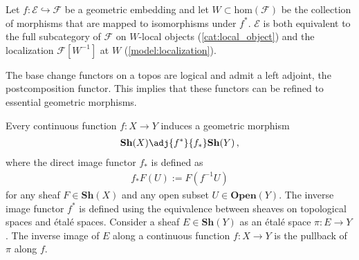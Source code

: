     \begin{property}\label{topos:characterization_embedding}
        Let $f:\mathcal{E}\hookrightarrow\mathcal{F}$ be a geometric embedding and let $W\subset\mathrm{hom}(\mathcal{F})$ be the collection of morphisms that are mapped to isomorphisms under $f^*$. $\mathcal{E}$ is both equivalent to the full subcategory of $\mathcal{F}$ on $W$-local objects (\cref{cat:local_object}) and the localization $\mathcal{F}[W^{-1}]$ at $W$ (\cref{model:localization}).
    \end{property}

    \begin{property}
        The base change functors on a topos are logical and admit a left adjoint, the postcomposition functor. This implies that these functors can be refined to essential geometric morphisms.
    \end{property}

    \begin{example}\label{topos:topological_spaces}
        Every continuous function $f:X\rightarrow Y$ induces a geometric morphism
        \begin{gather}
            \mathbf{Sh}(X)\adj{f^*}{f_*}\mathbf{Sh}(Y)\,,
        \end{gather}
        where the direct image functor $f_*$ is defined as
        \begin{gather}
            f_*F(U) := F(f^{-1}U)
        \end{gather}
        for any sheaf $F\in\mathbf{Sh}(X)$ and any open subset $U\in\mathbf{Open}(Y)$. The inverse image functor $f^*$ is defined using the equivalence between sheaves on topological spaces and \'etal\'e spaces. Consider a sheaf $E\in\mathbf{Sh}(Y)$ as an \'etal\'e space $\pi:E\rightarrow Y$. The inverse image of $E$ along a continuous function $f:X\rightarrow Y$ is the pullback of $\pi$ along $f$.
    \end{example}


